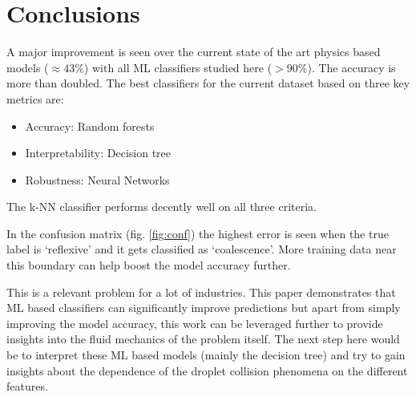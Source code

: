 \documentclass{article}
\begin{document}
\section{Conclusions}

A major improvement is seen over the current state of the art physics based models ($\approx 43\%$) with all ML classifiers studied here ($> 90\%$). The accuracy is more than doubled. The best classifiers for the current dataset based on three key metrics are:
\begin{itemize}
\item Accuracy: Random forests
\item Interpretability: Decision tree
\item Robustness: Neural Networks
\end{itemize}
The k-NN classifier performs decently well on all three criteria.

In the confusion matrix (fig. \ref{fig:conf}) the highest error is seen when the true label is `reflexive' and it gets classified as `coalescence'. More training data near this boundary can help boost the model accuracy further.

This is a relevant problem for a lot of industries. This paper demonstrates that ML based classifiers can significantly improve predictions but apart from simply improving the model accuracy, this work can be leveraged further to provide insights into the fluid mechanics of the problem itself. The next step here would be to interpret these ML based models (mainly the decision tree) and try to gain insights about the dependence of the droplet collision phenomena on the different features.





\end{document}
